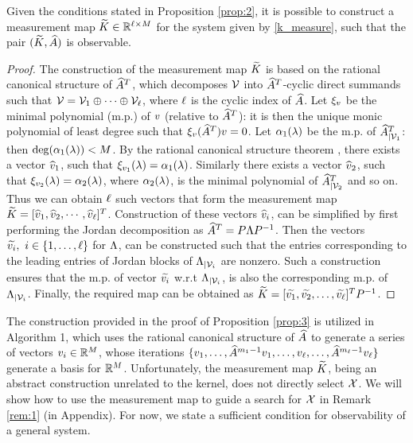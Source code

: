 \begin{proposition}\label{prop:3}
Given the conditions stated in Proposition \ref{prop:2}, it is possible to construct a measurement map $\widetilde{K} \in \mathbb{R}^{\ell\times M}$ for the system given by \eqref{k_measure}, such that the pair $(\widetilde{K}, \widehat{A})$ is observable.
\end{proposition}
\begin{proof}
	The construction of the measurement map $\widetilde{K}$ is based on the rational canonical structure of $\widehat{A}^T$, which decomposes $ \mathcal{V} $ into $\widehat{A}^T$-cyclic direct summands such that $\mathcal{V} = \mathcal{V}_1 \oplus \cdots \oplus \mathcal{V}_\ell$, where $\ell$ is the cyclic index of $\widehat{A}$. Let $\xi_{v}$ be the minimal polynomial (m.p.) of $ v $ (relative to $\widehat{A}^T$): it is then the unique monic polynomial of least degree such that $\xi_{v}(\widehat{A}^T)v=0$. Let $\alpha_1(\lambda)$ be the m.p. of ${\widehat{A}^T}_{|\mathcal{V}_1}$: then $\operatorname{deg}(\alpha_1(\lambda)) < M$. By the rational canonical structure theorem \cite{wonham1974linear}, there exists a vector $\widehat{v}_1$, such that $\xi_{v_1}(\lambda)=\alpha_1(\lambda)$. Similarly there exists a vector $\widehat{v}_2$, such that $\xi_{v_2}(\lambda)=\alpha_2(\lambda)$, where $\alpha_2(\lambda)$, is the minimal polynomial of ${\widehat{A}^T}_{|\mathcal{V}_2}$ and so on. Thus we can obtain $\ell$ such vectors that form the measurement map $\widetilde{K} = [\widehat{v}_1, \widehat{v}_2,\cdots, \widehat{v}_\ell]^T$. Construction of these vectors $\widehat{v}_i$, can be simplified by first performing the Jordan decomposition as $ \widehat{A}^T = P\Lambda P^{-1} $. Then the vectors $ \widetilde{v_i},\ i\in \{1,\dots,\ell\}$ for $ \Lambda $, can be constructed such that the entries corresponding to the leading entries of Jordan blocks of $ \Lambda_{|\mathcal{V}_i} $ are nonzero. Such a construction ensures that the m.p. of vector $ \widetilde{v_i}$ w.r.t $\Lambda_{|\mathcal{V}_i}$, is also the corresponding m.p. of 
	$\Lambda_{|\mathcal{V}_i}$. Finally, the required map can be obtained as $ \widetilde{K} = [\widetilde{v_1}, \widetilde{v_2},\dots,\widetilde{v_\ell}]^TP^{-1}$.
\end{proof}

The construction provided in the proof of Proposition \ref{prop:3} is utilized in Algorithm 1, which uses the rational canonical structure of $\widehat{A}$ to generate a series of vectors $v_i\in\mathbb{R}^{M}$, whose iterations $\{v_1,\dots,\widehat{A}^{m_1-1}v_1,\dots,v_{\ell},\dots,\widehat{A}^{m_{\ell}-1}v_{\ell}\}$ generate a basis for $\mathbb{R}^{M}$.
Unfortunately, the measurement map $\widetilde{K}$, being an abstract construction unrelated to the kernel, does not directly select $\mathcal{X}$. We will show how to use the measurement map to guide a search for $\mathcal{X}$ in Remark \ref{rem:1} (in Appendix). For now, we state a sufficient condition for observability of a general system. 

